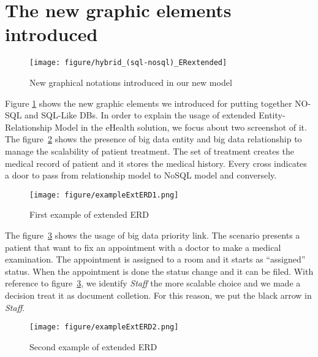 \section{The new graphic elements introduced}
\label{sec:discussion}
\begin{figure}[hbtp]
	\centering
	\texttt{[image: figure/hybrid\_(sql-nosql)\_ERextended]}
	\caption{New graphical notations introduced in our new model}
	\label{fig:new-el}
	
\end{figure}

Figure \ref{fig:new-el} shows the new graphic elements we introduced for putting together
 NO-SQL and SQL-Like DBs.
In order to explain the usage of extended Entity-Relationship Model in the eHealth solution, we focus about two screenshot of it. The figure~\ref{fig:exERD1} shows the presence of big data entity and big data relationship to manage the scalability of patient treatment. The set of treatment creates the medical record of patient and it stores the medical history. Every cross indicates a door to pass from relationship model to NoSQL model and conversely.
\begin{figure}[htb]
	\centering
	\texttt{[image: figure/exampleExtERD1.png]}
	\caption{First example of extended ERD}
	\label{fig:exERD1}
\end{figure}
\par
The figure~\ref{fig:exERD2} shows the usage of big data priority link. The scenario presents a patient that want to fix an appointment with a doctor to make a medical examination. The appointment is assigned to a room and it starts as ``assigned'' status. When the appointment is done the status change and it can be filed. With reference to figure~\ref{fig:exERD2}, we identify \textit{Staff} the more scalable choice and we made a decision treat it as document colletion.  For this reason, we put the black arrow in \textit{Staff}.

\begin{figure}[htp]
	\centering
	\texttt{[image: figure/exampleExtERD2.png]}
	\caption{Second example of extended ERD}
	\label{fig:exERD2}
\end{figure}


